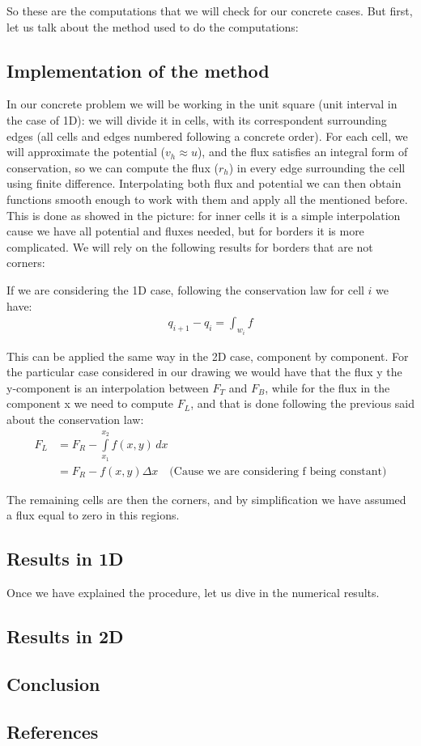 \documentclass{article}
\begin{document}
    So these are the computations that we will check for our concrete cases. But first, let us talk about the method used to do the computations:
    \subsection*{Implementation of the method}
    In our concrete problem we will be working in the unit square (unit interval in the case of 1D): we will divide it in cells, with its correspondent surrounding edges (all cells and edges numbered following a concrete order). For each cell, we will approximate the potential ($v_h \approx u$), and the flux satisfies an integral form of conservation, so we can compute the flux ($r_h$) in every edge surrounding the cell using finite difference. Interpolating both flux and potential we can then obtain functions smooth enough to work with them and apply all the mentioned before.
    This is done as showed in the picture: for inner cells it is a simple interpolation cause we have all potential and fluxes needed, but for borders it is more complicated. We will rely on the following results for borders that are not corners:

    If we are considering the 1D case, following the conservation law for cell $i$ we have:
    \begin{align*}
        q_{i+1} - q_i =  \int_{w_i} f
    \end{align*}

    This can be applied the same way in the 2D case, component by component. For the particular case considered in our drawing we would have that the flux y the y-component is an interpolation between $F_T$ and $F_B$, while for the flux in the component x we need to compute $F_L$, and that is done following the previous said about the conservation law:
    \begin{align*}
        F_L &= F_R - \int\limits_{x_1}^{x_2} f(x,y) \,dx\ \\
        &=  F_R - f(x,y)\Delta x \quad \text{(Cause we are considering f being constant)}
    \end{align*}

    The remaining cells are then the corners, and by simplification we have assumed a flux equal to zero in this regions.

    \subsection*{Results in 1D}
    Once we have explained the procedure, let us dive in the numerical results.

    \subsection*{Results in 2D}

    \subsection*{Conclusion}
    \subsection*{References}
\end{document}
